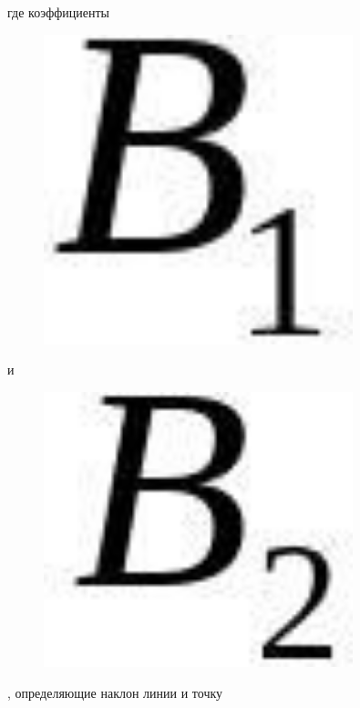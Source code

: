 где коэффициенты \begin{figure}[H]
	\centering
	\includegraphics[width=0.8\textwidth]{assets/105}
	\caption*{}
\end{figure} и
\begin{figure}[H]
	\centering
	\includegraphics[width=0.8\textwidth]{assets/106}
	\caption*{}
\end{figure}, определяющие наклон линии и точку
